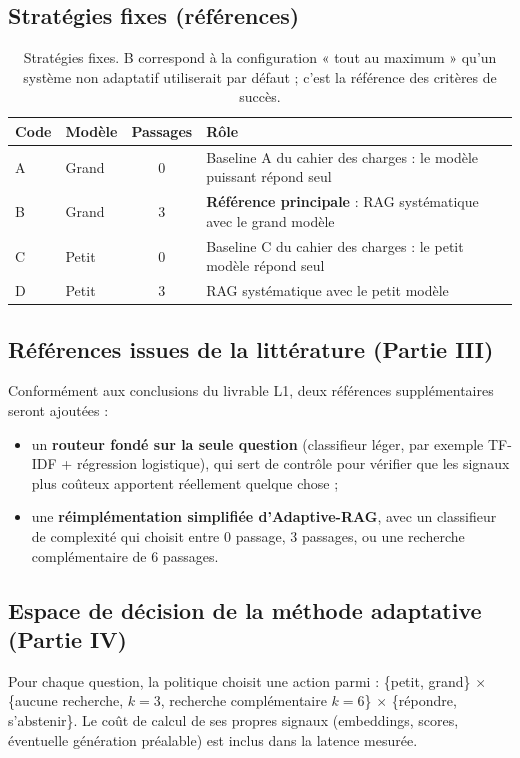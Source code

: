 \documentclass[11pt,a4paper]{article}
\begin{document}
\subsection{Stratégies fixes (références)}
\begin{table}[H]
\centering\small
\begin{tabularx}{\textwidth}{l l c Y}
\toprule
\textbf{Code} & \textbf{Modèle} & \textbf{Passages} & \textbf{Rôle} \\
\midrule
A & Grand & 0 & Baseline A du cahier des charges : le modèle puissant répond seul \\
B & Grand & 3 & \textbf{Référence principale} : RAG systématique avec le grand modèle \\
C & Petit & 0 & Baseline C du cahier des charges : le petit modèle répond seul \\
D & Petit & 3 & RAG systématique avec le petit modèle \\
\bottomrule
\end{tabularx}
\caption{Stratégies fixes. B correspond à la configuration « tout au maximum » qu'un système non
adaptatif utiliserait par défaut ; c'est la référence des critères de succès.}
\label{tab:strategies}
\end{table}

\subsection{Références issues de la littérature (Partie III)}
Conformément aux conclusions du livrable L1, deux références supplémentaires seront ajoutées :
\begin{itemize}
\item un \textbf{routeur fondé sur la seule question} (classifieur léger, par exemple TF-IDF + régression
logistique), qui sert de contrôle pour vérifier que les signaux plus coûteux apportent réellement
quelque chose ;
\item une \textbf{réimplémentation simplifiée d'Adaptive-RAG}, avec un classifieur de complexité qui
choisit entre 0 passage, 3 passages, ou une recherche complémentaire de 6 passages.
\end{itemize}

\subsection{Espace de décision de la méthode adaptative (Partie IV)}
Pour chaque question, la politique choisit une action parmi :
\{petit, grand\} $\times$ \{aucune recherche, $k=3$, recherche complémentaire $k=6$\} $\times$
\{répondre, s'abstenir\}. Le coût de calcul de ses propres signaux (embeddings, scores, éventuelle
génération préalable) est inclus dans la latence mesurée.
\end{document}
